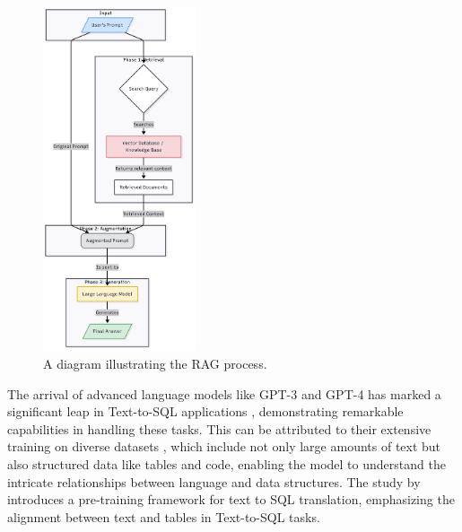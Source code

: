        \begin{figure}[h!]
            \centering
            \includegraphics[width=0.4\textwidth]{images/rag_diagram_vertical.png}
            \caption{A diagram illustrating the RAG process.}
            \label{fig:rag_diagram}
        \end{figure}         
        
        The arrival of advanced language models like GPT-3 and GPT-4 \citep{OpenAImodels} has marked a significant leap in Text-to-SQL applications \citep{Singh2023}, demonstrating remarkable capabilities in handling these tasks. 
        This can be attributed to their extensive training on diverse datasets \citep{Deng2021}, which include not only large amounts of text but also structured data like tables and code, enabling the model to understand the intricate relationships between language and data structures. 
        The study by \citep{Deng2023} introduces a pre-training framework for text to SQL translation, emphasizing the alignment between text and tables in Text-to-SQL tasks.



